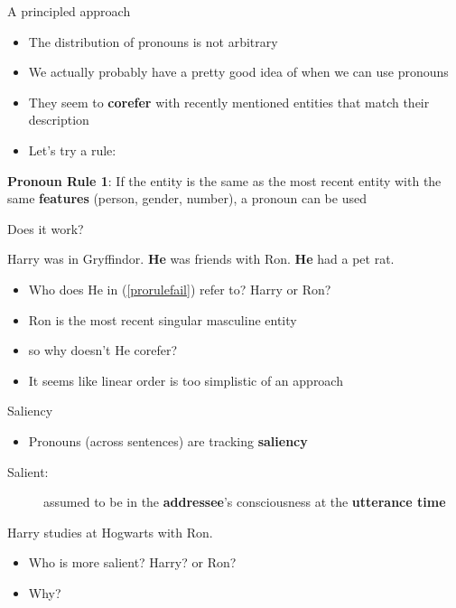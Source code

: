 \documentclass[10pt, compress]{beamer}
\begin{document}
\begin{frame}{A principled approach}
	\begin{itemize}
		\item The distribution of pronouns is not arbitrary
		\item We actually probably have a pretty good idea of when we can use pronouns \pause
		\item They seem to \textbf{corefer} with recently mentioned entities that match their description \pause
		\item Let's try a rule:
	\end{itemize}

	\begin{exe}
		\ex \textbf{Pronoun Rule 1}: If the entity is the same as the most recent entity with the same \textbf{features} (person, gender, number), a pronoun can be used
	\end{exe}
\end{frame}

\begin{frame}{Does it work?}
	\begin{exe}
		\ex \begin{xlist}
			\ex Harry was in Gryffindor.
			\ex \textbf{He} was friends with Ron.
			\ex\label{prorulefail} \textbf{He} had a pet rat.
		\end{xlist}
	\end{exe}

	\begin{itemize}
		\item Who does \alert{He} in (\ref{prorulefail}) refer to? Harry or Ron? \pause
		\item Ron is the most recent singular masculine entity
		\item so why doesn't \alert{He} corefer? \pause
		\item It seems like linear order is too simplistic of an approach
	\end{itemize}
\end{frame}

\begin{frame}{Saliency}
	\begin{itemize}
		\item Pronouns (across sentences) are tracking \textbf{saliency}
	\end{itemize}

	\begin{description}
		\item[Salient:] assumed to be in the \textbf{addressee}'s consciousness at the \textbf{utterance time} \pause
	\end{description}

	\begin{exe}
		\ex Harry studies at Hogwarts with Ron.
	\end{exe}

	\begin{itemize}
		\item Who is more salient? Harry? or Ron? \pause
		\item Why?
	\end{itemize}
\end{frame}
\end{document}
